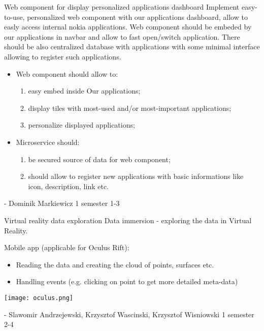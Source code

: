 \begin{project}
{Web component for display personalized applications dashboard}
{Implement easy-to-use, personalized web component with our applications dashboard, allow to easly access internal nokia applications.  Web component should be embeded by our applications in navbar and allow to fast open/switch application. There should be also centralized database with applications with some minimal interface allowing to register such applications.} 
{
\begin{itemize}
	\item Web component should allow to:
		\begin{enumerate}
			\item easy embed inside Our applications;
			\item display tiles with most-used and/or most-important applications;
			\item personalize displayed applications;
		\end{enumerate}
	\item Microservice should:
		\begin{enumerate}
			\item be secured source of data for web component;
			\item should allow to register new applications with basic informations like icon, description, link etc.
		\end{enumerate}
\end{itemize}
}
{-}
{Dominik Markiewicz}
{1 semester}
{1-3}
\end{project}
\begin{project}
{Virtual reality data exploration}
{Data immersion - exploring the data in Virtual Reality.} 
{ 
Mobile app (applicable for Oculus Rift):
\begin{itemize}
	\item Reading the data and creating the cloud of points, surfaces etc.
	\item Handling events (e.g. clicking on point to get more detailed meta-data)
\end{itemize}
\begin{center}\texttt{[image: oculus.png]}\end{center}
}
{-}
{Slawomir Andrzejewski, Krzysztof Wascinski, Krzysztof Wisniowski}
{1 semester}
{2-4}
\end{project}
